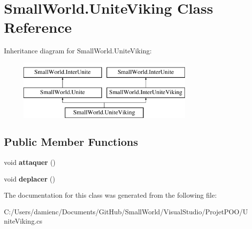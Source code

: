 \hypertarget{class_small_world_1_1_unite_viking}{\section{Small\-World.\-Unite\-Viking Class Reference}
\label{class_small_world_1_1_unite_viking}
}
Inheritance diagram for Small\-World.\-Unite\-Viking\-:\begin{figure}[H]
\begin{center}
\leavevmode
\includegraphics[height=3.000000cm]{class_small_world_1_1_unite_viking}
\end{center}
\end{figure}
\subsection*{Public Member Functions}
\begin{DoxyCompactItemize}
\item 
\hypertarget{class_small_world_1_1_unite_viking_acffa544aa9cc76789d2ba193884e3252}{void {\bfseries attaquer} ()}\label{class_small_world_1_1_unite_viking_acffa544aa9cc76789d2ba193884e3252}

\item 
\hypertarget{class_small_world_1_1_unite_viking_a9fbf828b2e54dfd2837340488b10817b}{void {\bfseries deplacer} ()}\label{class_small_world_1_1_unite_viking_a9fbf828b2e54dfd2837340488b10817b}

\end{DoxyCompactItemize}


The documentation for this class was generated from the following file\-:\begin{DoxyCompactItemize}
\item 
C\-:/\-Users/damienc/\-Documents/\-Git\-Hub/\-Small\-World/\-Visual\-Studio/\-Projet\-P\-O\-O/Unite\-Viking.\-cs\end{DoxyCompactItemize}
